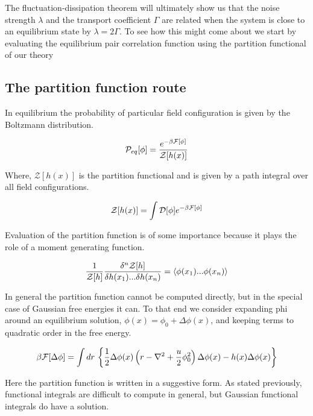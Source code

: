The fluctuation-dissipation theorem will ultimately show us that the noise strength $\lambda$ and the transport coefficient $\Gamma$ are related when the system is close to an equilibrium state by $\lambda = 2\Gamma$. To see how this might come about we start by evaluating the equilibrium pair correlation function using the partition functional of our theory

\subsection{The partition function route}

In equilibrium the probability of particular field configuration is given by the Boltzmann distribution. 

\begin{equation}
\mathcal{P}_{eq}[\phi] = \frac{e^{-\beta\mathcal{F}[\phi]}}{\mathcal{Z}[h(x)]}
\end{equation}

Where, $\mathcal{Z}[h(x)]$ is the partition functional and is given by a path integral over all field configurations. 

\begin{equation}
\mathcal{Z}[h(x)] = \int \mathcal{D}[\phi] e^{-\beta\mathcal{F}[\phi]}
\end{equation}

Evaluation of the partition function is of some importance because it plays the role of a moment generating function. 

\begin{equation}\label{gen}
\frac{1}{\mathcal{Z}[h]}\frac{\delta^n \mathcal{Z}[h]}{\delta h(x_1)...\delta h(x_n)} = \langle \phi(x_1)...\phi(x_n)\rangle
\end{equation}

In general the partition function cannot be computed directly, but in the special case of Gaussian free energies it can. To that end we consider expanding phi around an equilibrium solution, $\phi(x) = \phi_0 + \Delta\phi(x)$, and keeping terms to quadratic order in the free energy.

\begin{equation}
\beta\mathcal{F}[\Delta\phi] = \int dr \,\left\lbrace \frac{1}{2}\Delta\phi(x) \left(r - \nabla^2 + \frac{u}{2}\phi_0^2\right) \Delta\phi(x) - h(x)\Delta\phi(x) \right\rbrace
\end{equation}

Here the partition function is written in a suggestive form. As stated previously, functional integrals are difficult to compute in general, but Gaussian functional integrals do have a solution. 

